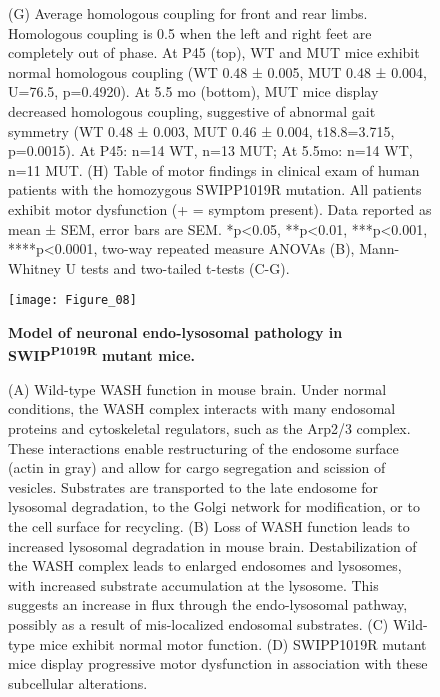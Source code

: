 \begin{figure}[!ht]
\begin{fullwidth}
\begin{center}
{	(G) Average homologous coupling for front and rear limbs. Homologous coupling is
	0.5 when the left and right feet are completely out of phase. At P45 (top), WT
	and MUT mice exhibit normal homologous coupling (WT 0.48 ± 0.005, MUT 0.48 ±
	0.004, U=76.5, p=0.4920). At 5.5 mo (bottom), MUT mice display decreased
	homologous coupling, suggestive of abnormal gait symmetry (WT 0.48 ± 0.003, MUT
	0.46 ± 0.004, t18.8=3.715, p=0.0015). At P45: n=14 WT, n=13 MUT; At 5.5mo: n=14
	WT, n=11 MUT. 
	(H) Table of motor findings in clinical exam of human patients with the
	homozygous SWIPP1019R mutation. All patients exhibit motor dysfunction (+ =
	symptom present). Data reported as mean ± SEM, error bars are SEM. *p<0.05,
	**p<0.01, ***p<0.001, ****p<0.0001, two-way repeated measure ANOVAs (B),
	Mann-Whitney U tests and two-tailed t-tests (C-G).
	}
	\label{fig:fig7}
	\end{center}
	\end{fullwidth}
\end{figure}


\begin{figure}[!ht]
	\begin{fullwidth}
	\begin{center}
	\captionsetup{labelformat=empty}
	\texttt{[image: Figure\_08]}
	\caption{\textbf{Model of neuronal endo-lysosomal pathology in
		SWIP\textsuperscript{P1019R} mutant mice.}}
	\end{center}
	\end{fullwidth}
\end{figure}

\begin{figure}[!ht]
	\begin{fullwidth}
	\begin{center}
	\captionsetup{labelformat=adja-page}
	\ContinuedFloat
	\caption{
		(A) Wild-type WASH function in mouse brain. Under normal conditions, the WASH
		complex interacts with many endosomal proteins and cytoskeletal regulators, such
		as the Arp2/3 complex. These interactions enable restructuring of the endosome
		surface (actin in gray) and allow for cargo segregation and scission of
		vesicles. Substrates are transported to the late endosome for lysosomal
		degradation, to the Golgi network for modification, or to the cell surface for
		recycling. 
		(B) Loss of WASH function leads to increased lysosomal degradation in mouse
		brain. Destabilization of the WASH complex leads to enlarged endosomes and
		lysosomes, with increased substrate accumulation at the lysosome. This suggests
		an increase in flux through the endo-lysosomal pathway, possibly as a result of
		mis-localized endosomal substrates. 
		(C) Wild-type mice exhibit normal motor function. 
		(D) SWIPP1019R mutant mice display progressive motor dysfunction in association
		with these subcellular alterations.
	}
	\label{fig:fig8}
	\end{center}
	\end{fullwidth}
\end{figure}
